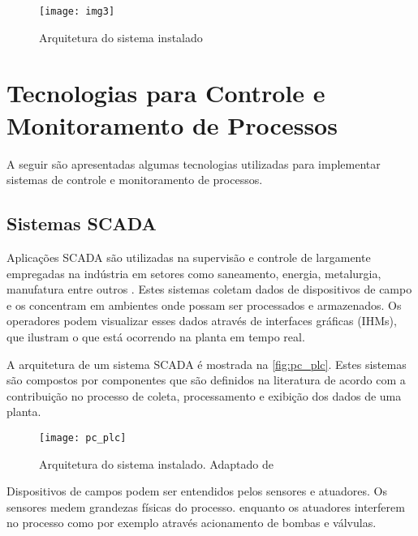 			\begin{figure}[!htb]	
				\captionsetup{justification=centering}
				\begin{center}
					\texttt{[image: img3]}  %
					\caption[Arquitetura do sistema instalado]{\label{img3}Arquitetura do sistema instalado}
				\end{center}		
			\end{figure}
		
	
	\section{Tecnologias para Controle e Monitoramento de Processos}
		\label{sec:rev_monitor}
		A seguir são apresentadas algumas tecnologias utilizadas para implementar sistemas de controle e monitoramento de processos.
		
		\subsection{Sistemas SCADA}
		Aplicações SCADA são utilizadas na supervisão e controle de largamente empregadas na indústria em setores como saneamento, energia, metalurgia, manufatura entre outros \cite{pablo2011}. Estes sistemas coletam dados de dispositivos de campo e os concentram em ambientes onde possam ser processados e armazenados. Os operadores podem visualizar esses dados através de interfaces gráficas (IHMs), que ilustram o que está ocorrendo na planta em tempo real. 
		
		A arquitetura de um sistema SCADA é mostrada na \autoref{fig:pc_plc}. Estes sistemas são compostos por componentes que são definidos na literatura de acordo com a contribuição no processo de coleta, processamento e exibição dos dados de uma planta.
		
		\begin{figure}[!htb]	
			\captionsetup{justification=centering}
			\begin{center}
				\texttt{[image: pc\_plc]}  %
				\caption[Arquitetura do sistema instalado]{\label{fig:pc_plc}Arquitetura do sistema instalado. Adaptado de \textcite{pablo2011}}
			\end{center}		
		\end{figure}
	
		Dispositivos de campos podem ser entendidos pelos sensores e atuadores. Os sensores medem grandezas físicas do processo. enquanto os atuadores interferem no processo como por exemplo através  acionamento de bombas e válvulas. 
	
